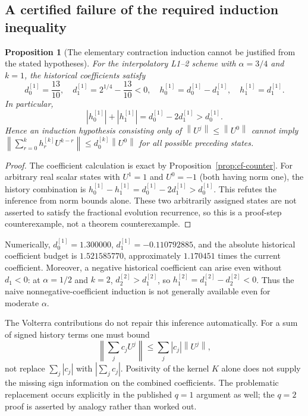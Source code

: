 \documentclass[11pt]{amsart}
\numberwithin{equation}{section}
\newtheorem{proposition}{Proposition}[section]
\theoremstyle{remark}
\newcommand{\norm}[1]{\left\lVert #1\right\rVert}
\newcommand{\abs}[1]{\left\lvert #1\right\rvert}
\begin{document}
\subsection{A certified failure of the required induction inequality}
\begin{proposition}[The elementary contraction induction cannot be justified
from the stated hypotheses]\label{prop:st-gap}
For the interpolatory L1--2 scheme with $\alpha=3/4$ and $k=1$, the
historical coefficients satisfy
\[
d_0^{[1]}=\frac{13}{10},\quad
d_1^{[1]}=2^{1/4}-\frac{13}{10}<0,\quad
h_0^{[1]}=d_0^{[1]}-d_1^{[1]},\quad h_1^{[1]}=d_1^{[1]}.
\]
In particular,
\begin{equation}\label{eq:st-budget}
\abs{h_0^{[1]}}+\abs{h_1^{[1]}}=d_0^{[1]}-2d_1^{[1]}>d_0^{[1]}.
\end{equation}
Hence an induction hypothesis consisting only of
$\norm{U^j}\leq\norm{U^0}$ cannot imply
$\norm{\sum_{r=0}^kh_r^{[k]}U^{k-r}}\leq d_0^{[k]}\norm{U^0}$ for all
possible preceding states.
\end{proposition}
\begin{proof}
The coefficient calculation is exact by Proposition~\ref{prop:cf-counter}.
For arbitrary real scalar states with $U^1=1$ and $U^0=-1$ (both having
norm one), the history combination is
$h_0^{[1]}-h_1^{[1]}=d_0^{[1]}-2d_1^{[1]}>d_0^{[1]}$. This refutes the
inference from norm bounds alone. These two arbitrarily assigned states are
not asserted to satisfy the fractional evolution recurrence, so this is a
proof-step counterexample, not a theorem counterexample.
\end{proof}

Numerically, $d_0^{[1]}=1.300000$, $d_1^{[1]}=-0.110792885$, and the
absolute historical coefficient budget is $1.521585770$, approximately
$1.170451$ times the current coefficient. Moreover, a negative historical
coefficient can arise even without $d_1<0$: at $\alpha=1/2$ and $k=2$,
$d_2^{[2]}>d_1^{[2]}$, so $h_1^{[2]}=d_1^{[2]}-d_2^{[2]}<0$. Thus the
naive nonnegative-coefficient induction is not generally available even for
moderate $\alpha$.

The Volterra contributions do not repair this inference automatically.
For a sum of signed history terms one must bound
\[
\norm{\sum_jc_jU^j}\leq\sum_j\abs{c_j}\norm{U^j},
\]
not replace $\sum_j\abs{c_j}$ with $\abs{\sum_jc_j}$.
Positivity of the kernel $K$ alone does not supply the missing
sign information on the combined coefficients. The problematic replacement
occurs explicitly in the published $q=1$ argument as well; the $q=2$ proof
is asserted by analogy rather than worked out.
\end{document}
